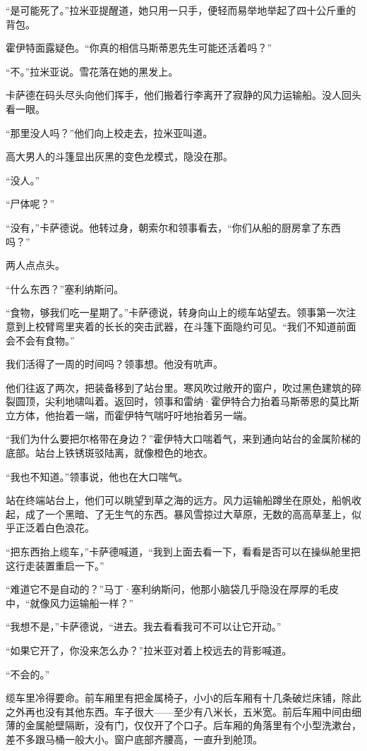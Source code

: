 \documentclass[AutoFakeBold=true]{book}
\begin{document}
``是可能死了。''拉米亚提醒道，她只用一只手，便轻而易举地举起了四十公斤重的背包。

霍伊特面露疑色。``你真的相信马斯蒂恩先生可能还活着吗？''

``不。''拉米亚说。雪花落在她的黑发上。

卡萨德在码头尽头向他们挥手，他们搬着行李离开了寂静的风力运输船。没人回头看一眼。

``那里没人吗？''他们向上校走去，拉米亚叫道。

高大男人的斗篷显出灰黑的变色龙模式，隐没在那。

``没人。''

``尸体呢？''

``没有，''卡萨德说。他转过身，朝索尔和领事看去，``你们从船的厨房拿了东西吗？''

两人点点头。

``什么东西？''塞利纳斯问。

``食物，够我们吃一星期了。''卡萨德说，转身向山上的缆车站望去。领事第一次注意到上校臂弯里夹着的长长的突击武器，在斗篷下面隐约可见。``我们不知道前面会不会有食物。''

我们活得了一周的时间吗？领事想。他没有吭声。

他们往返了两次，把装备移到了站台里。寒风吹过敞开的窗户，吹过黑色建筑的碎裂圆顶，尖利地啸叫着。返回时，领事和雷纳·霍伊特合力抬着马斯蒂恩的莫比斯立方体，他抬着一端，而霍伊特气喘吁吁地抬着另一端。

``我们为什么要把尔格带在身边？''霍伊特大口喘着气，来到通向站台的金属阶梯的底部。站台上铁锈斑驳陆离，就像橙色的地衣。

``我也不知道。''领事说，他也在大口喘气。

站在终端站台上，他们可以眺望到草之海的远方。风力运输船蹲坐在原处，船帆收起，成了一个黑暗、了无生气的东西。暴风雪掠过大草原，无数的高高草茎上，似乎正泛着白色浪花。

``把东西抬上缆车，''卡萨德喊道，``我到上面去看一下，看看是否可以在操纵舱里把这行走装置重启一下。''

``难道它不是自动的？''马丁·塞利纳斯问，他那小脑袋几乎隐没在厚厚的毛皮中，``就像风力运输船一样？''

``我想不是，''卡萨德说，``进去。我去看看我可不可以让它开动。''

``如果它开了，你没来怎么办？''拉米亚对着上校远去的背影喊道。

``不会的。''

\vspace*{1em}

缆车里冷得要命。前车厢里有把金属椅子，小小的后车厢有十几条破烂床铺，除此之外再也没有其他东西。车子很大——至少有八米长，五米宽。前后车厢中间由细薄的金属舱壁隔断，没有门，仅仅开了个口子。后车厢的角落里有个小型洗漱台，差不多跟马桶一般大小。窗户底部齐腰高，一直升到舱顶。
\end{document}
